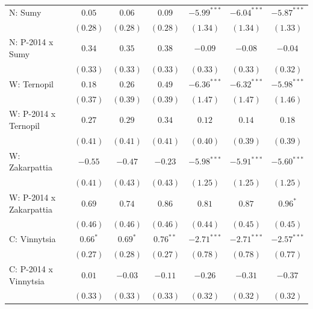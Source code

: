 \begin{table}
\begin{center}
\begin{small}
\begin{tabular}{l c c c c c c}
N: Sumy                     & $0.05$        & $0.06$       & $0.09$        & $-5.99^{***}$  & $-6.04^{***}$  & $-5.87^{***}$  \\
                            & $(0.28)$      & $(0.28)$     & $(0.28)$      & $(1.34)$       & $(1.34)$       & $(1.33)$       \\
N: P-2014 x Sumy            & $0.34$        & $0.35$       & $0.38$        & $-0.09$        & $-0.08$        & $-0.04$        \\
                            & $(0.33)$      & $(0.33)$     & $(0.33)$      & $(0.33)$       & $(0.33)$       & $(0.32)$       \\
W: Ternopil                 & $0.18$        & $0.26$       & $0.49$        & $-6.36^{***}$  & $-6.32^{***}$  & $-5.98^{***}$  \\
                            & $(0.37)$      & $(0.39)$     & $(0.39)$      & $(1.47)$       & $(1.47)$       & $(1.46)$       \\
W: P-2014 x Ternopil        & $0.27$        & $0.29$       & $0.34$        & $0.12$         & $0.14$         & $0.18$         \\
                            & $(0.41)$      & $(0.41)$     & $(0.41)$      & $(0.40)$       & $(0.39)$       & $(0.39)$       \\
W: Zakarpattia              & $-0.55$       & $-0.47$      & $-0.23$       & $-5.98^{***}$  & $-5.91^{***}$  & $-5.60^{***}$  \\
                            & $(0.41)$      & $(0.43)$     & $(0.43)$      & $(1.25)$       & $(1.25)$       & $(1.25)$       \\
W: P-2014 x Zakarpattia     & $0.69$        & $0.74$       & $0.86$        & $0.81$         & $0.87$         & $0.96^{*}$     \\
                            & $(0.46)$      & $(0.46)$     & $(0.46)$      & $(0.44)$       & $(0.45)$       & $(0.45)$       \\
C: Vinnytsia                & $0.66^{*}$    & $0.69^{*}$   & $0.76^{**}$   & $-2.71^{***}$  & $-2.71^{***}$  & $-2.57^{***}$  \\
                            & $(0.27)$      & $(0.28)$     & $(0.27)$      & $(0.78)$       & $(0.78)$       & $(0.77)$       \\
C: P-2014 x Vinnytsia       & $0.01$        & $-0.03$      & $-0.11$       & $-0.26$        & $-0.31$        & $-0.37$        \\
                            & $(0.33)$      & $(0.33)$     & $(0.33)$      & $(0.32)$       & $(0.32)$       & $(0.32)$       \\

\end{tabular}
\end{small}
\end{center}
\end{table}
